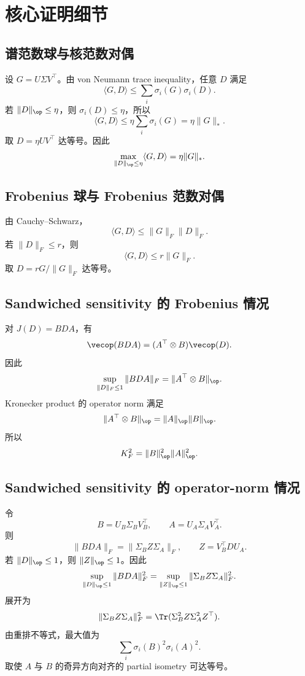 \section{核心证明细节}
\label{sec:appendix-proofs}

\subsection{谱范数球与核范数对偶}

设 \(G=U\Sigma V^\top\)。由 von Neumann trace inequality，任意 \(D\) 满足
\[
\langle G,D\rangle
\le
\sum_i\sigma_i(G)\sigma_i(D).
\]
若 \(\|D\|_{\op}\le \eta\)，则 \(\sigma_i(D)\le \eta\)，所以
\[
\langle G,D\rangle
\le
\eta\sum_i\sigma_i(G)
=\eta\|G\|_*.
\]
取 \(D=\eta UV^\top\) 达等号。因此
\[
\max_{\|D\|_{\op}\le\eta}\langle G,D\rangle=\eta\|G\|_*.
\]

\subsection{Frobenius 球与 Frobenius 范数对偶}

由 Cauchy--Schwarz，
\[
\langle G,D\rangle
\le
\|G\|_F\|D\|_F.
\]
若 \(\|D\|_F\le r\)，则
\[
\langle G,D\rangle\le r\|G\|_F.
\]
取 \(D=rG/\|G\|_F\) 达等号。

\subsection{Sandwiched sensitivity 的 Frobenius 情况}

对 \(J(D)=BDA\)，有
\[
\vecop(BDA)=(A^\top\otimes B)\vecop(D).
\]
因此
\[
\sup_{\|D\|_F\le1}\|BDA\|_F
=
\|A^\top\otimes B\|_{\op}.
\]
Kronecker product 的 operator norm 满足
\[
\|A^\top\otimes B\|_{\op}
=
\|A\|_{\op}\|B\|_{\op}.
\]
所以
\[
K_F^2=\|B\|_{\op}^2\|A\|_{\op}^2.
\]

\subsection{Sandwiched sensitivity 的 operator-norm 情况}

令
\[
B=U_B\Sigma_BV_B^\top,
\qquad
A=U_A\Sigma_AV_A^\top.
\]
则
\[
\|BDA\|_F=\|\Sigma_B Z\Sigma_A\|_F,
\qquad
Z=V_B^\top D U_A.
\]
若 \(\|D\|_{\op}\le1\)，则 \(\|Z\|_{\op}\le1\)。因此
\[
\sup_{\|D\|_{\op}\le1}\|BDA\|_F^2
=
\sup_{\|Z\|_{\op}\le1}\|\Sigma_BZ\Sigma_A\|_F^2.
\]
展开为
\[
\|\Sigma_BZ\Sigma_A\|_F^2
=
\Tr(\Sigma_B^2 Z\Sigma_A^2Z^\top).
\]
由重排不等式，最大值为
\[
\sum_i\sigma_i(B)^2\sigma_i(A)^2.
\]
取使 \(A\) 与 \(B\) 的奇异方向对齐的 partial isometry 可达等号。
